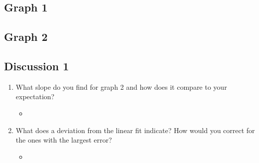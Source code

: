 \documentclass{article}
\begin{document}
\begin{table}[!htp]
\begin{center}
    \subsection*{Graph 1}
    \subsection*{Graph 2}
    \subsection*{Discussion 1}
    \begin{enumerate}
      \item What slope do you find for graph 2 and how does it compare to your expectation?
      \begin{itemize}
        \item
      \end{itemize}
      \item What does a deviation from the linear fit indicate? How would you correct for the ones with the largest error?
      \begin{itemize}
        \item
      \end{itemize}
    \end{enumerate}
  \end{center}
\end{table}
\end{document}
